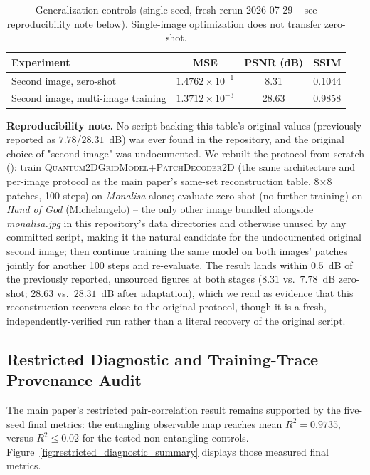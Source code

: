 \documentclass[11pt]{article}
\begin{document}
\begin{table}[H]
\centering
\caption{Generalization controls (single-seed, fresh rerun 2026-07-29 -- see reproducibility note below). Single-image optimization does not transfer zero-shot.}
\label{tab:generalization_controls}
\scriptsize
\begin{tabular}{lccc}
\toprule
Experiment & MSE & PSNR (dB) & SSIM \\
\midrule
Second image, zero-shot & $1.4762\times10^{-1}$ & 8.31 & 0.1044 \\
Second image, multi-image training & $1.3712\times10^{-3}$ & 28.63 & 0.9858 \\
\bottomrule
\end{tabular}
\end{table}

\textbf{Reproducibility note.} No script backing this table's original values (previously reported as $7.78$/$28.31$~dB) was ever found in the repository, and the original choice of "second image" was undocumented. We rebuilt the protocol from scratch (): train \textsc{Quantum2DGridModel}+\textsc{PatchDecoder2D} (the same architecture and per-image protocol as the main paper's same-set reconstruction table, 8$\times$8 patches, 100 steps) on \textit{Monalisa} alone; evaluate zero-shot (no further training) on \textit{Hand of God} (Michelangelo) -- the only other image bundled alongside \textit{monalisa.jpg} in this repository's data directories and otherwise unused by any committed script, making it the natural candidate for the undocumented original second image; then continue training the same model on both images' patches jointly for another 100 steps and re-evaluate. The result lands within $0.5$~dB of the previously reported, unsourced figures at both stages ($8.31$ vs.\ $7.78$~dB zero-shot; $28.63$ vs.\ $28.31$~dB after adaptation), which we read as evidence that this reconstruction recovers close to the original protocol, though it is a fresh, independently-verified run rather than a literal recovery of the original script.


\subsection{Restricted Diagnostic and Training-Trace Provenance Audit}
\label{sec:restricted_ablation}
The main paper's restricted pair-correlation result remains supported by the five-seed final metrics: the entangling observable map reaches mean $R^2=0.9735$, versus $R^2\leq0.02$ for the tested non-entangling controls. Figure~\ref{fig:restricted_diagnostic_summary} displays those measured final metrics.
\end{document}
